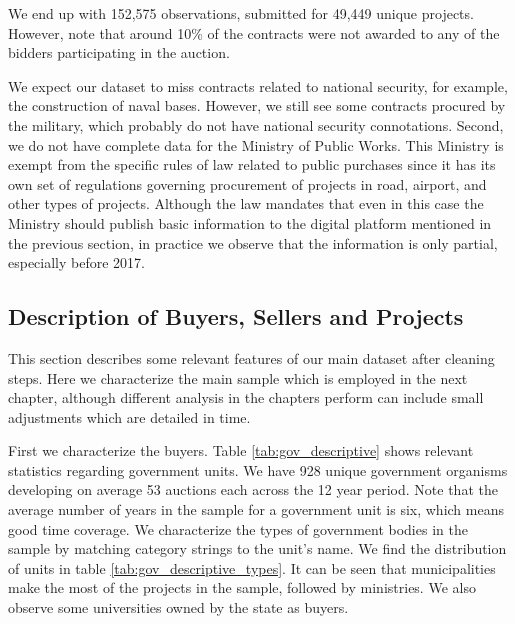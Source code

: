 We end up with 152,575 observations, submitted for 49,449 unique projects. However, note that around 10\% of the contracts were not awarded to any  of the bidders participating in the auction.

We expect our dataset to miss contracts related to national security, for example, the construction of naval bases. However, we still see some contracts procured by the military, which probably do not have national security connotations. Second, we do not have complete data for the Ministry of Public Works. This Ministry is exempt from the specific rules of law related to public purchases since it has its own set of regulations governing procurement of projects in road, airport, and other types of projects. Although the law mandates that even in this case the Ministry should publish basic information to the digital platform mentioned in the previous section, in practice we observe that the information is only partial, especially before 2017. %

\subsection{Description of Buyers, Sellers and Projects}
This section describes some relevant features of our main dataset after cleaning steps. Here we characterize the main sample which is employed in the next chapter, although different analysis in the chapters perform can include small adjustments which are detailed in time.

First we characterize the buyers. Table \ref{tab:gov_descriptive} shows relevant statistics regarding government units. We have 928 unique government organisms developing on average 53 auctions each across the 12 year period. Note that the average number of years in the sample for a government unit is six, which means good time coverage. We characterize the types of government bodies in the sample by matching category strings to the unit's name. We find the distribution of units in table \ref{tab:gov_descriptive_types}. It can be seen that municipalities make the most of the projects in the sample, followed by ministries. We also observe some universities owned by the state as buyers.

